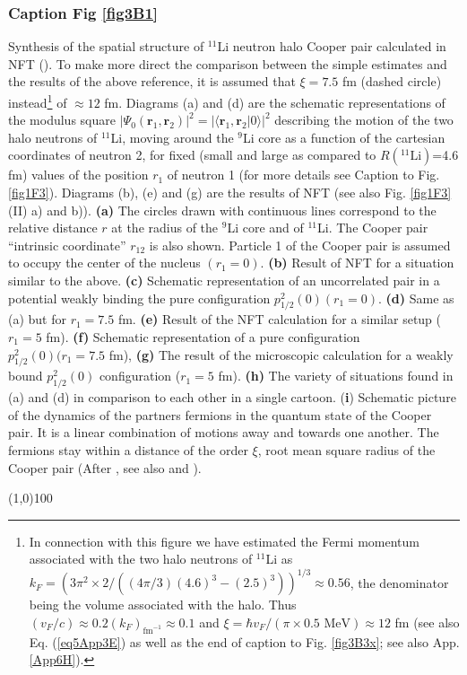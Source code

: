 \begin{subappendices}
         \subsubsection{Caption Fig \ref{fig3B1}}
         Synthesis of the spatial structure of $^{11}$Li neutron halo Cooper pair calculated in NFT (\cite{Barranco:01}). To make more direct the comparison between the simple estimates and the results of the above reference, it is assumed that $\xi=7.5$ fm (dashed circle) instead\footnote{In connection with this figure we have estimated the Fermi momentum associated with the two halo neutrons of $^{11}$Li as $k_F=(3\pi^2\times2/((4\pi/3)(4.6)^3-(2.5)^3))^{1/3}\approx0.56$, the denominator being the volume associated with the halo. Thus $(v_F/c)\approx0.2(k_F)_{\text{fm}^{-1}}\approx 0.1$ and $\xi=\hbar v_F/(\pi\times0.5\text{ MeV})\approx 12$ fm (see also Eq. (\ref{eq5App3E}) as well as the end of caption to Fig. \ref{fig3B3x}; see also App. \ref{App6H}).} of $\approx 12$ fm. Diagrams (a) and (d) are the schematic representations of the modulus square $|\Psi_0(\mathbf r_1, \mathbf r_2)|^2=|\langle\mathbf r_1, \mathbf r_2|0\rangle|^2$ describing the motion of the two halo neutrons of $^{11}$Li, moving around the $^{9}$Li core as a function of the cartesian coordinates of neutron 2, for fixed (small and large as compared to $R(^{11}\text{Li})$=4.6 fm) values of the position $r_1$ of neutron 1 (for more details see Caption to Fig. \ref{fig1F3}). Diagrams (b), (e) and (g) are the results of NFT (see also Fig. \ref{fig1F3} (II) a) and b)). \textbf{(a)} The  circles drawn with continuous lines correspond to the relative distance $r$ at the radius of the $^{9}$Li core and of $^{11}$Li. The Cooper pair ``intrinsic coordinate'' $r_{12}$ is also shown. Particle 1 of the Cooper pair is assumed to occupy the center of the nucleus $(r_1=0)$. \textbf{(b)} Result of NFT for a situation similar to the above. \textbf{(c)} Schematic representation of an uncorrelated pair in a potential weakly binding the pure configuration $p^2_{1/2}(0) (r_1=0)$. \textbf{(d)} Same as (a) but for $r_1=7.5$ fm. \textbf{(e)} Result of the NFT calculation for a similar setup ($r_1=5$ fm). \textbf{(f)} Schematic representation of a pure configuration $p^2_{1/2}(0) (r_1=7.5$ fm), \textbf{(g)} The result of the microscopic calculation for a weakly bound $p^2_{1/2}(0)$ configuration ($r_1=5$ fm). \textbf{(h)} The variety of situations found in (a) and (d) in comparison to each other in a single cartoon. (\textbf{i}) Schematic picture of the dynamics of the partners fermions in the quantum state of the Cooper pair. It is a linear combination of motions away and towards one another. The fermions stay within a distance of the order $\xi$, root mean square radius of the Cooper pair (After \cite{Weisskopf:81}, see also \cite{Kadin:07} and \cite{VanWitsen:14}).
\begin{center}
	\line(1,0){100}
\end{center}
         

\end{subappendices}
